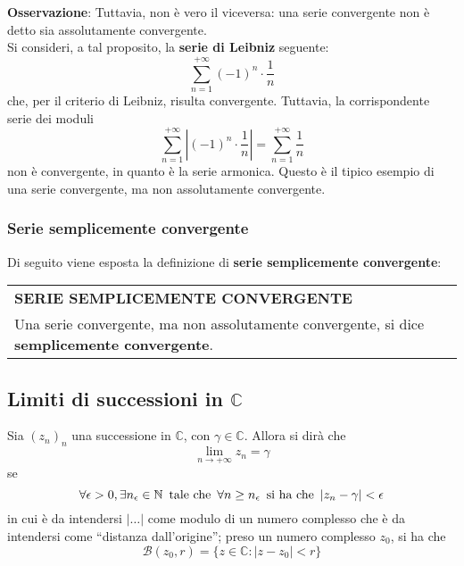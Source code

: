 \documentclass[a4paper]{extarticle}
\newcommand{\quotes}[1]{``#1''}
\renewcommand\arraystretch{}
\begin{document}
\vspace{2em}
\noindent
\textbf{Osservazione}: Tuttavia, non è vero il viceversa: una serie convergente non è detto sia assolutamente convergente.\\
Si consideri, a tal proposito, la \textbf{serie di Leibniz} seguente:
\[\sum_{n=1}^{+\infty} (-1)^n \cdot \frac{1}{n}\]
che, per il criterio di Leibniz, risulta convergente. Tuttavia, la corrispondente serie dei moduli
\[\sum_{n=1}^{+\infty} \left \vert (-1)^n \cdot \frac{1}{n} \right \vert = \sum_{n=1}^{+\infty} \frac{1}{n}\]
non è convergente, in quanto è la serie armonica. Questo è il tipico esempio di una serie convergente, ma non assolutamente convergente.

\vspace{1em}
\subsubsection{Serie semplicemente convergente}
Di seguito viene esposta la definizione di \textbf{serie semplicemente convergente}:

\vspace{1em}
\setlength{\tabcolsep}{14pt}
\renewcommand{\arraystretch}{2}
\noindent
\begin{tabularx}{\textwidth}{@{}|P|@{}}
    \hline
    {\textbf{SERIE SEMPLICEMENTE CONVERGENTE}}\\
    \parbox{\linewidth}{Una serie convergente, ma non assolutamente convergente, si dice \textbf{semplicemente convergente}.\vspace{3mm}}\\
    \hline
\end{tabularx}

\vspace{2em}
\noindent
\subsection{Limiti di successioni in $\mathbb{C}$}
Sia $(z_n)_n$ una successione in $\mathbb{C}$, con $\gamma \in \mathbb{C}$. Allora si dirà che
\[\lim_{n \to +\infty} z_n = \gamma\]
se
\[\forall \epsilon > 0, \exists n_\epsilon \in \mathbb{N} \hspace{0.5em} \text{tale che} \hspace{0.5em} \forall n \geq n_\epsilon \hspace{0.5em} \text{si ha che} \hspace{0.5em} \vert z_n - \gamma \vert < \epsilon\]
in cui è da intendersi $\vert \dots \vert$ come modulo di un numero complesso che è da intendersi come \quotes{distanza dall'origine}; preso un numero complesso $z_0$, si ha che
\[\mathcal{B}(z_0,r) = \{z \in \mathbb{C} : \left \vert z  - z_0 \right \vert < r\}\]
\end{document}
